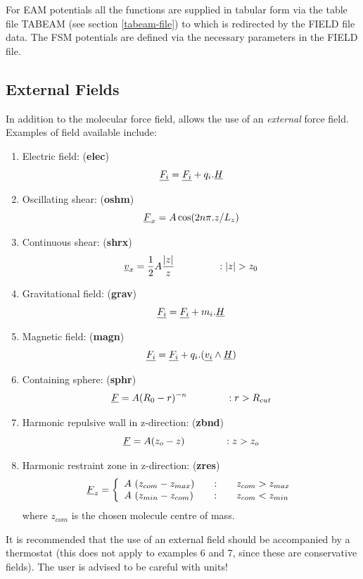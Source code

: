 For EAM potentials all the functions are supplied in tabular form via
the table file TABEAM (see section \ref{tabeam-file}) to which \D{} is
redirected by the FIELD file data.  The FSM potentials are defined via
the necessary parameters in the FIELD file.


\subsection{External Fields}

In addition to the molecular force field, \D{} allows the use of
an {\em external} force field. Examples of field available include:
\begin{enumerate}
\item Electric field: ({\bf elec})
\begin{equation} \mbox{$\underline{F_i}$} = \mbox{$\underline{F_i}$} + q_i. \mbox{$\underline{H}$} \end {equation}
\item Oscillating shear: ({\bf oshm})
\begin{equation} \mbox{$\underline{F}$}_{x}=A\cos(2n\pi.z/L_{z}) \end{equation}
\item Continuous shear: ({\bf shrx})
\begin{equation}
\vek{v}_{x}=\frac{1}{2}A\frac{|z|}{z}~~~~~~~~~~~~~:|z|>z_{0}\end{equation}
\item Gravitational field: ({\bf grav})
\begin{equation} \mbox{$\underline{F_i}$} = \mbox{$\underline{F_i}$} + m_i. \mbox{$\underline{H}$} \end {equation}
\item Magnetic field: ({\bf magn})
\begin{equation} \mbox{$\underline{F_i}$} = \mbox{$\underline{F_i}$} + q_i.(\mbox{$\underline{v_i}$}\wedge \mbox{$\underline{H}$})
\end {equation}
\item Containing sphere: ({\bf sphr})
\begin{equation} \mbox{$\underline{F}$}=A(R_{0}-r)^{-n}~~~~~~~~~~~~: r>R_{cut} \end{equation}
\item Harmonic repulsive wall in z-direction: ({\bf zbnd})
\begin{equation} \mbox{$\underline{F}$}=A(z_{o}-z)~~~~~~~~~~~~: z>z_{o} \end{equation}
\item Harmonic restraint zone in z-direction: ({\bf zres})
\begin{equation}
\vek{F}_{z} = \left\{ \begin{array} {l@{\qquad:\qquad}l}
A~(z_{com}-z_{max}) & z_{com} > z_{max} \\
A~(z_{min}-z_{com}) & z_{com} < z_{min}
\end{array} \right.
\end{equation}
where $z_{com}$ is the chosen molecule centre of mass.
\end{enumerate}
It is recommended that the use of an external field should be
accompanied by a thermostat (this does not apply to
examples 6 and 7, since these are conservative fields). The user is
advised to be careful with units!

